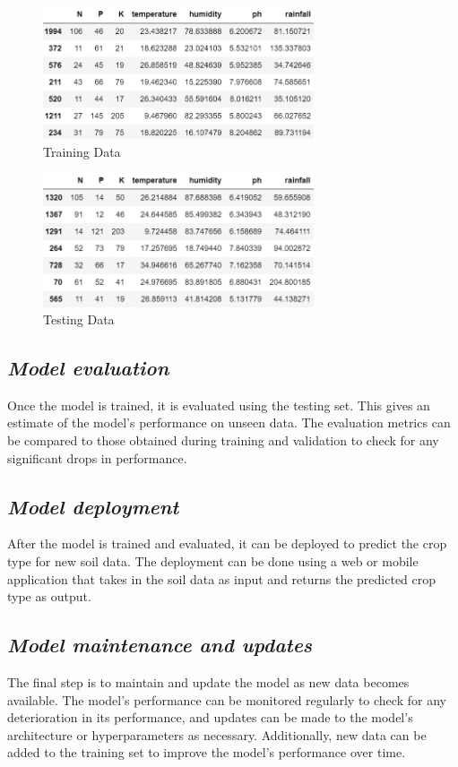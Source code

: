 \documentclass[conference]{IEEEtran}
\begin{document}
\begin{figure}[h!]
    \centering
    \includegraphics[width = 8cm] {x_train.png}
    \caption{Training Data}
    \label{fig:Training Data}
\end{figure}

\begin{figure}[h!]
    \centering
    \includegraphics[width = 8cm] {x_test.png}
    \caption{Testing Data}
    \label{fig:Testing Data}
\end{figure}


\subsection{\emph{\textbf{Model evaluation}}}
Once the model is trained, it is evaluated using the testing set. This gives an estimate of the model's performance on unseen data. The evaluation metrics can be compared to those obtained during training and validation to check for any significant drops in performance.

\subsection{\emph{\textbf{Model deployment}}}
After the model is trained and evaluated, it can be deployed to predict the crop type for new soil data. The deployment can be done using a web or mobile application that takes in the soil data as input and returns the predicted crop type as output.

\subsection{\emph{\textbf{Model maintenance and updates}}}
The final step is to maintain and update the model as new data becomes available. The model's performance can be monitored regularly to check for any deterioration in its performance, and updates can be made to the model's architecture or hyperparameters as necessary. Additionally, new data can be added to the training set to improve the model's performance over time.  
\end{document}
